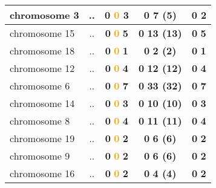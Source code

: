 \begin{table}[H]
\begin{tabular}{||l|c|c|c|c||}
\hline
chromosome 3&..&\textcolor{vert}{\textbf{0}} \textcolor{orange}{\textbf{0}} \textcolor{rose}{\textbf{3}} &\textcolor{vert}{\textbf{0}} \textcolor{rose}{\textbf{7 (5)}} &\textcolor{vert}{\textbf{0}} \textcolor{rose}{\textbf{2}} \\
\hline
chromosome 15&..&\textcolor{vert}{\textbf{0}} \textcolor{orange}{\textbf{0}} \textcolor{rose}{\textbf{5}} &\textcolor{vert}{\textbf{0}} \textcolor{rose}{\textbf{13 (13)}} &\textcolor{vert}{\textbf{0}} \textcolor{rose}{\textbf{5}} \\
\hline
chromosome 18&..&\textcolor{vert}{\textbf{0}} \textcolor{orange}{\textbf{0}} \textcolor{rose}{\textbf{1}} &\textcolor{vert}{\textbf{0}} \textcolor{rose}{\textbf{2 (2)}} &\textcolor{vert}{\textbf{0}} \textcolor{rose}{\textbf{1}} \\
\hline
chromosome 12&..&\textcolor{vert}{\textbf{0}} \textcolor{orange}{\textbf{0}} \textcolor{rose}{\textbf{4}} &\textcolor{vert}{\textbf{0}} \textcolor{rose}{\textbf{12 (12)}} &\textcolor{vert}{\textbf{0}} \textcolor{rose}{\textbf{4}} \\
\hline
chromosome 6&..&\textcolor{vert}{\textbf{0}} \textcolor{orange}{\textbf{0}} \textcolor{rose}{\textbf{7}} &\textcolor{vert}{\textbf{0}} \textcolor{rose}{\textbf{33 (32)}} &\textcolor{vert}{\textbf{0}} \textcolor{rose}{\textbf{7}} \\
\hline
chromosome 14&..&\textcolor{vert}{\textbf{0}} \textcolor{orange}{\textbf{0}} \textcolor{rose}{\textbf{3}} &\textcolor{vert}{\textbf{0}} \textcolor{rose}{\textbf{10 (10)}} &\textcolor{vert}{\textbf{0}} \textcolor{rose}{\textbf{3}} \\
\hline
chromosome 8&..&\textcolor{vert}{\textbf{0}} \textcolor{orange}{\textbf{0}} \textcolor{rose}{\textbf{4}} &\textcolor{vert}{\textbf{0}} \textcolor{rose}{\textbf{11 (11)}} &\textcolor{vert}{\textbf{0}} \textcolor{rose}{\textbf{4}} \\
\hline
chromosome 19&..&\textcolor{vert}{\textbf{0}} \textcolor{orange}{\textbf{0}} \textcolor{rose}{\textbf{2}} &\textcolor{vert}{\textbf{0}} \textcolor{rose}{\textbf{6 (6)}} &\textcolor{vert}{\textbf{0}} \textcolor{rose}{\textbf{2}} \\
\hline
chromosome 9&..&\textcolor{vert}{\textbf{0}} \textcolor{orange}{\textbf{0}} \textcolor{rose}{\textbf{2}} &\textcolor{vert}{\textbf{0}} \textcolor{rose}{\textbf{6 (6)}} &\textcolor{vert}{\textbf{0}} \textcolor{rose}{\textbf{2}} \\
\hline
chromosome 16&..&\textcolor{vert}{\textbf{0}} \textcolor{orange}{\textbf{0}} \textcolor{rose}{\textbf{2}} &\textcolor{vert}{\textbf{0}} \textcolor{rose}{\textbf{4 (4)}} &\textcolor{vert}{\textbf{0}} \textcolor{rose}{\textbf{2}} \\

\end{tabular}
\end{table}
